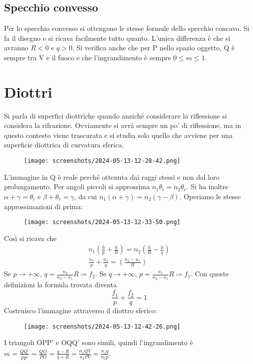 \subsection{Specchio convesso}
Per lo specchio convesso si ottengono le stesse formule dello specchio concavo. Si fa il disegno e si ricava facilmente tutto quanto. L'unica differenza è che si avranno \(R<0\) e \(q>0\). Si verifica anche che per P nello spazio oggetto, Q è sempre tra V e il fuoco e che l'ingrandimento è sempre \(0 \leq m \leq 1\).

\section{Diottri}
Si parla di superfici diottriche quando anziché considerare la riflessione si considera la rifrazione. Ovviamente si avrà sempre un po' di riflessione, ma in questo contesto viene trascurata e si studia solo quello che avviene per una superficie diottrica di curvatura sferica.
\begin{figure}[H]
	\centering
	\texttt{[image: screenshots/2024-05-13-12-28-42.png]}
\end{figure}
L'immagine in Q è reale perché ottenuta dai raggi stessi e non dal loro prolungamento. Per angoli piccoli si approssima \(n_1 \theta _i = n_2 \theta _r\). Si ha inoltre \(\alpha + \gamma = \theta _i\) e \(\beta + \theta _r = \gamma \), da cui \(n_1 (\alpha + \gamma )=n_2(\gamma -\beta )\). Operiamo le stesse approssimazioni di prima:
\begin{figure}[H]
	\centering
	\texttt{[image: screenshots/2024-05-13-12-33-50.png]}
\end{figure}
Così si ricava che
\begin{gather}
	n_1 \left( \frac{h}{p} +\frac{h}{R} \right) = n_2 \left( \frac{h}{R} - \frac{h}{q} \right)\\
	\frac{n_1}{p} + \frac{n_2}{q} = \left( \frac{n_2 - n_1}{R} \right)   
\end{gather}
Se \(p\to +\infty \), \(q=\frac{n_2}{n_2 -n_1}R \coloneqq f_2\). Se \(q \to +\infty\), \(p=\frac{n_1}{n_2 - n_1}R \coloneqq f_1\). Con queste definizioni la formula trovata diventa
\begin{equation}
	\frac{f_1}{p}+\frac{f_2}{q}=1
\end{equation}
Costruisco l'immagine attraverso il diottro sferico:
\begin{figure}[H]
	\centering
	\texttt{[image: screenshots/2024-05-13-12-42-26.png]}
\end{figure}
I triangoli OPP' e OQQ' sono simili, quindi l'ingrandimento è \(m=\frac{QQ^{\prime} }{PP^{\prime} }=\frac{QO}{PO}=\frac{q-R}{q+R}=\frac{n_1 QV}{n_2 PV}= \frac{n_1 q}{n_2 p}\).

